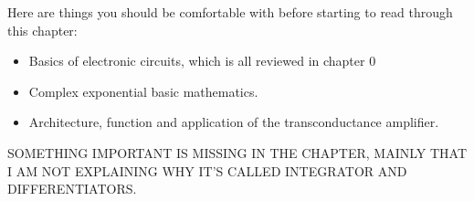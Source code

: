 Here are things you should be comfortable with before starting to read through this chapter: 
\begin{itemize}
    \item Basics of electronic circuits, which is all reviewed in chapter 0
    \item Complex exponential basic mathematics.  
    \item Architecture, function and application of the transconductance amplifier.
\end{itemize}

SOMETHING IMPORTANT IS MISSING IN THE CHAPTER, MAINLY THAT I AM NOT EXPLAINING WHY IT'S CALLED INTEGRATOR AND DIFFERENTIATORS.





